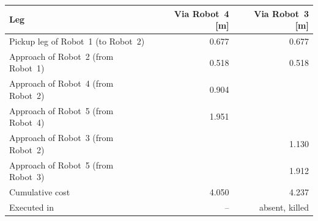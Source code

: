 \begin{tabular}{@{}lrr@{}}
\toprule
        \textbf{Leg} & \textbf{Via Robot~4 [m]} & \textbf{Via Robot~3 [m]} \\
\midrule
        Pickup leg of Robot~1 (to Robot~2) & 0.677 & 0.677 \\
        Approach of Robot~2 (from Robot~1) & 0.518 & 0.518 \\
        Approach of Robot~4 (from Robot~2) & 0.904 &  \\
        Approach of Robot~5 (from Robot~4) & 1.951 &  \\
        Approach of Robot~3 (from Robot~2) &  & 1.130 \\
        Approach of Robot~5 (from Robot~3) &  & 1.912 \\
\midrule
        Cumulative cost & 4.050 & 4.237 \\
        Executed in & -- & absent, killed \\
\bottomrule
\end{tabular}
